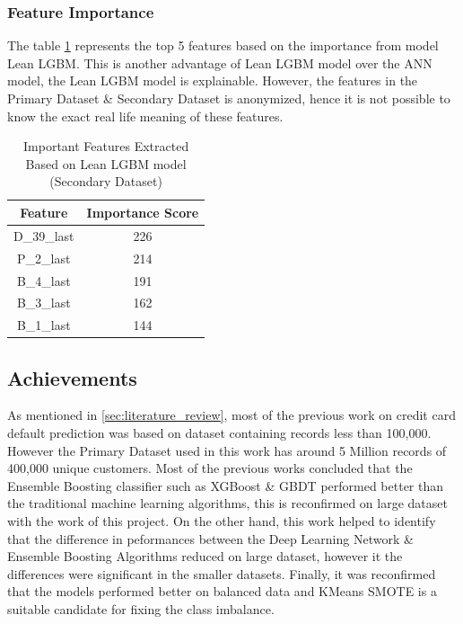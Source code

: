\documentclass[twoside,11pt,a4paper]{article}
\begin{document}
\subsubsection{Feature Importance} \label{subsec:feature_imp}
The table \ref{table:imp_features} represents the top 5 features based on the importance from model Lean \acs{LGBM}. This is another advantage of Lean \acs{LGBM} model over the \acs{ANN} model, the Lean \acs{LGBM} model is explainable. However, the features in the Primary Dataset \& Secondary Dataset is anonymized, hence it is not possible to know the exact real life meaning of these features.

\begin{table}[h]
	\begin{center}
		\begin{tabular}{|| c | c ||} 
			\hline
			Feature & Importance Score \\ [0.5ex] 
			\hline\hline
			D\_39\_last &	226 \\
			\hline
			P\_2\_last &	214 \\
			\hline
			B\_4\_last &	191 \\
			\hline
			B\_3\_last &	162 \\
			\hline
			B\_1\_last &	144 \\
			\hline
		\end{tabular}
		\caption{Important Features Extracted Based on Lean \acs{LGBM} model  (Secondary Dataset)}
		\label{table:imp_features}
	\end{center}
\end{table}


\subsection{Achievements}
As mentioned in \ref{sec:literature_review}, most of the previous work on credit card default prediction was based on dataset containing records less than 100,000. However the Primary Dataset used in this work has around 5 Million records of 400,000 unique customers. Most of the previous works concluded that the Ensemble Boosting classifier such as \acs{XGBoost} \& \acs{GBDT} performed better than the traditional machine learning algorithms, this is reconfirmed on large dataset with the work of this project. On the other hand, this work helped to identify  that the difference in peformances between the Deep Learning Network \& Ensemble Boosting Algorithms reduced on large dataset, however it the differences were significant in the smaller datasets. Finally, it was reconfirmed that the models performed better on balanced data and  KMeans \acs{SMOTE} is a suitable candidate for fixing the class imbalance.
\end{document}

